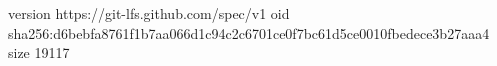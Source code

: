 version https://git-lfs.github.com/spec/v1
oid sha256:d6bebfa8761f1b7aa066d1c94c2c6701ce0f7bc61d5ce0010fbedece3b27aaa4
size 19117
